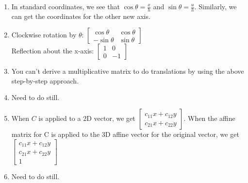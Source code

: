 \documentclass{article}
\begin{document}
\begin{enumerate}
	\item In standard coordinates, we see that $\cos{\theta} = \frac{x}{h}$ and $\sin{\theta} = \frac{u}{h}$. Similarly, we can get the coordinates for the other new axis.
	
	\item Clockwise rotation by $\theta$: $
	\begin{bmatrix}
		\cos{\theta}	&\cos{\theta}\\
		-\sin{\theta}	&\sin{\theta}
	\end{bmatrix}
	$\\
	Reflection about the x-axis: $
	\begin{bmatrix}
		1	&0\\
		0	&-1
	\end{bmatrix}
	$
	
	\item You can't derive a multiplicative matrix to do translations by using the above step-by-step approach. 
	
	\item Need to do still. 
	
	\item When $C$ is applied to a 2D vector, we get $
	\begin{bmatrix}
		c_{11}x + c_{12}y\\
		c_{21}x + c_{22}y
	\end{bmatrix}
	$. When the affine matrix for C is applied to the 3D affine vector for the original vector, we get $
	\begin{bmatrix}
		c_{11}x + c_{12}y\\
		c_{21}x + c_{22}y\\
		1	
	\end{bmatrix}
	$
	
	\item Need to do still.
	

\end{enumerate}
\end{document}
